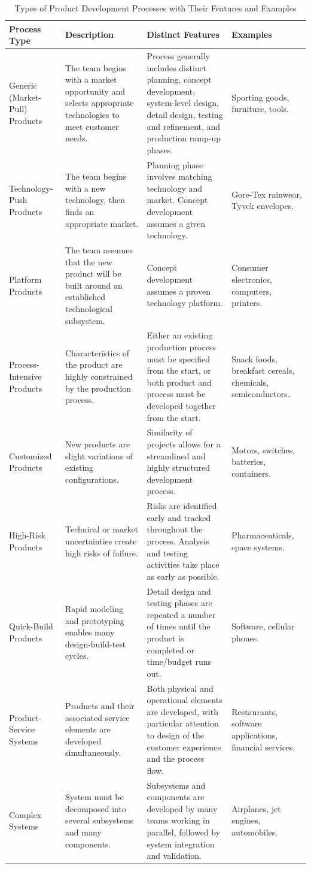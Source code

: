 \begin{longtable}{|p{3.2cm}|p{4.2cm}|p{5.4cm}|p{2.5cm}|}
\caption{Types of Product Development Processes with Their Features and Examples}
\label{tab:session2-process-types} \\
\hline
\textbf{Process Type} & \textbf{Description} & \textbf{Distinct Features} & \textbf{Examples} \\
\hline
Generic (Market-Pull) Products & The team begins with a market opportunity and selects appropriate technologies to meet customer needs. & Process generally includes distinct planning, concept development, system-level design, detail design, testing and refinement, and production ramp-up phases. & Sporting goods, furniture, tools. \\
\hline
Technology-Push Products & The team begins with a new technology, then finds an appropriate market. & Planning phase involves matching technology and market. Concept development assumes a given technology. & Gore-Tex rainwear, Tyvek envelopes. \\
\hline
Platform Products & The team assumes that the new product will be built around an established technological subsystem. & Concept development assumes a proven technology platform. & Consumer electronics, computers, printers. \\
\hline
Process-Intensive Products & Characteristics of the product are highly constrained by the production process. & Either an existing production process must be specified from the start, or both product and process must be developed together from the start. & Snack foods, breakfast cereals, chemicals, semiconductors. \\
\hline
Customized Products & New products are slight variations of existing configurations. & Similarity of projects allows for a streamlined and highly structured development process. & Motors, switches, batteries, containers. \\
\hline
High-Risk Products & Technical or market uncertainties create high risks of failure. & Risks are identified early and tracked throughout the process. Analysis and testing activities take place as early as possible. & Pharmaceuticals, space systems. \\
\hline
Quick-Build Products & Rapid modeling and prototyping enables many design-build-test cycles. & Detail design and testing phases are repeated a number of times until the product is completed or time/budget runs out. & Software, cellular phones. \\
\hline
Product-Service Systems & Products and their associated service elements are developed simultaneously. & Both physical and operational elements are developed, with particular attention to design of the customer experience and the process flow. & Restaurants, software applications, financial services. \\
\hline
Complex Systems & System must be decomposed into several subsystems and many components. & Subsystems and components are developed by many teams working in parallel, followed by system integration and validation. & Airplanes, jet engines, automobiles. \\
\hline
\end{longtable}